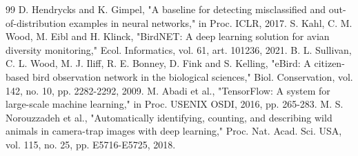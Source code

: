 \documentclass[conference]{IEEEtran}
\begin{document}
\begin{thebibliography}{99}
 D. Hendrycks and K. Gimpel, "A baseline for detecting misclassified and out-of-distribution examples in neural networks," in Proc. ICLR, 2017.
 S. Kahl, C. M. Wood, M. Eibl and H. Klinck, "BirdNET: A deep learning solution for avian diversity monitoring," Ecol. Informatics, vol. 61, art. 101236, 2021.
 B. L. Sullivan, C. L. Wood, M. J. Iliff, R. E. Bonney, D. Fink and S. Kelling, "eBird: A citizen-based bird observation network in the biological sciences," Biol. Conservation, vol. 142, no. 10, pp. 2282-2292, 2009.
 M. Abadi et al., "TensorFlow: A system for large-scale machine learning," in Proc. USENIX OSDI, 2016, pp. 265-283.
 M. S. Norouzzadeh et al., "Automatically identifying, counting, and describing wild animals in camera-trap images with deep learning," Proc. Nat. Acad. Sci. USA, vol. 115, no. 25, pp. E5716-E5725, 2018.
\end{thebibliography}
\end{document}
